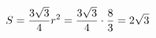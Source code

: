 \documentclass[preview]{standalone}
\begin{document}
\begin{align*}
\special{dvisvgm:raw <g id='unique000'>}S=\frac{3\sqrt{3}}{4}r^2=\frac{3\sqrt{3}}{4}\cdot\frac{8}{3}=2\sqrt{3}\special{dvisvgm:raw </g>}
\end{align*}
\end{document}
